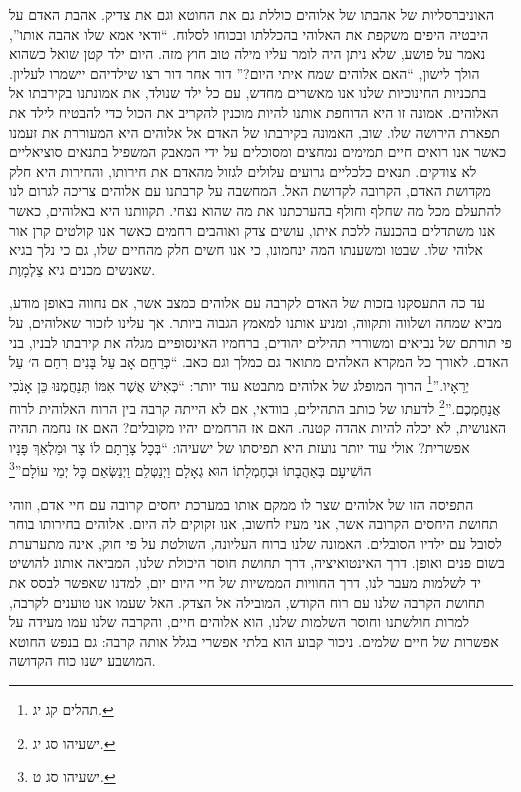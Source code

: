 \documentclass[12pt, extrafontsizes, twopage, a5paper]{memoir}
\begin{document}
האוניברסליות של אהבתו של אלוהים כוללת גם את החוטא וגם את צדיק. אהבת האדם על היבטיה היפים משקפת את האלוהי בהכללתו ובכוחו לסלוח. ``ודאי אמא שלו אהבה אותו'', נאמר על פושע, שלא ניתן היה לומר עליו מילה טוב חוץ מזה. היום ילד קטן שואל כשהוא הולך לישון, ``האם אלוהים שמח איתי היום?'' דור אחר דור רצו שילדיהם יישמרו לעליון. בתכניות החינוכיות שלנו אנו מאשרים מחדש, עם כל ילד שנולד, את אמונתנו בקירבתו אל האלוהים. אמונה זו היא הדוחפת אותנו להיות מוכנין להקריב את הכול כדי להבטיח לילד את תפארת הירושה שלו. שוב, האמונה בקירבתו של האדם אל אלוהים היא המעוררת את זעמנו כאשר אנו רואים חיים תמימים נמחצים ומסוכלים על ידי המאבק המשפיל בתנאים סוציאליים לא צודקים. תנאים כלכליים גרועים עלולים לגזול מהאדם את חירותו, והחירות היא חלק מקדושת האדם, הקרובה לקדושת האל. המחשבה על קרבתנו עם אלוהים צריכה לגרום לנו להתעלם מכל מה שחלף וחולף בהערכתנו את מה שהוא נצחי. תקוותנו היא באלוהים, כאשר אנו משתדלים בהכנעה ללכת איתו, עושים צדק ואוהבים רחמים כאשר אנו קולטים קרן אור אלוהי שלו. שבטו ומשענתו המה ינחמונו, כי אנו חשים חלק מהחיים שלו, גם כי נלך בגיא שאנשים מכנים גיא צַלְמָוֶת.

עד כה התעסקנו בזכות של האדם לקרבה עם אלוהים כמצב אשר, אם נחווה באופן מודע, מביא שמחה ושלווה ותקווה, ומניע אותנו למאמץ הגבוה ביותר. אך עלינו לזכור שאלוהים, על פי תורתם של נביאים ומשוררי תהילים יהודים, ברחמיו האינסופיים מגלה את קירבתו לבניו, בני האדם. לאורך כל המקרא האלהים מתואר גם כמלך וגם כאב. ``כְּרַחֵם אָב עַל בָּנִים רִחַם ה׳ עַל יְרֵאָיו.''\footnote{תהלים קג יג.} הרוך המופלג של אלוהים מתבטא עוד יותר: ``כְּאִישׁ אֲשֶׁר אִמּוֹ תְּנַחֲמֶנּוּ כֵּן אָנֹכִי אֲנַחֶמְכֶם.''\footnote{ישעיהו סג יג.} לדעתו של כותב התהילים, בוודאי, אם לא הייתה קרבה בין הרוח האלוהית לרוח האנושית, לא יכלה להיות אהדה קטנה. האם אז הרחמים יהיו מקובלים? האם אז נחמה תהיה אפשרית? אולי עוד יותר נועזת היא תפיסתו של ישעיהו: ``בְּכׇל צָרָתָם לוֹ צָר וּמַלְאַךְ פָּנָיו הוֹשִׁיעָם בְּאַהֲבָתוֹ וּבְחֶמְלָתוֹ הוּא גְאָלָם וַיְנַטְּלֵם וַיְנַשְּׂאֵם כׇּל יְמֵי עוֹלָם''\footnote{ישעיהו סג ט.}

התפיסה הזו של אלוהים שצר לו ממקם אותו במערכת יחסים קרובה עם חיי אדם, וזוהי תחושת היחסים הקרובה אשר, אני מעיז לחשוב, אנו זקוקים לה היום. אלוהים בחירותו בוחר לסובל עם ילדיו הסובלים. האמונה שלנו ברוח העליונה, השולטת על פי חוק, אינה מתערערת בשום פנים ואופן. דרך האינטואיציה, דרך תחושת חוסר היכולת שלנו, המביאה אותונ להושיט יד לשלמות מעבר לנו, דרך החוויות הממשיות של חיי היום יום, למדנו שאפשר לבסס את תחושת הקרבה שלנו עם רוח הקודש, המובילה אל הצדק. האל שעמו אנו טוענים לקרבה, למרות חולשתנו וחוסר השלמות שלנו, הוא אלוהים חיים, והקרבה שלנו עמו מעידה על אפשרות של חיים שלמים. ניכור קבוע הוא בלתי אפשרי בגלל אותה קרבה: גם בנפש החוטא המושבע ישנו כוח הקדושה.
\end{document}
